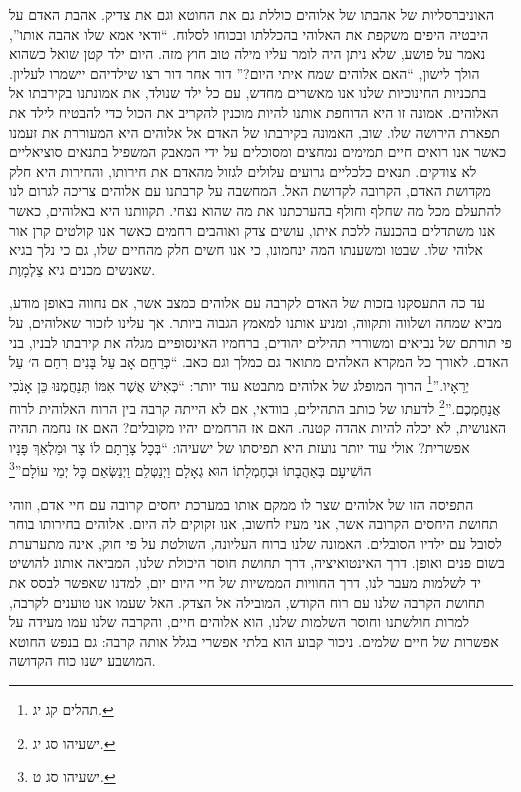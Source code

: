 \documentclass[12pt, extrafontsizes, twopage, a5paper]{memoir}
\begin{document}
האוניברסליות של אהבתו של אלוהים כוללת גם את החוטא וגם את צדיק. אהבת האדם על היבטיה היפים משקפת את האלוהי בהכללתו ובכוחו לסלוח. ``ודאי אמא שלו אהבה אותו'', נאמר על פושע, שלא ניתן היה לומר עליו מילה טוב חוץ מזה. היום ילד קטן שואל כשהוא הולך לישון, ``האם אלוהים שמח איתי היום?'' דור אחר דור רצו שילדיהם יישמרו לעליון. בתכניות החינוכיות שלנו אנו מאשרים מחדש, עם כל ילד שנולד, את אמונתנו בקירבתו אל האלוהים. אמונה זו היא הדוחפת אותנו להיות מוכנין להקריב את הכול כדי להבטיח לילד את תפארת הירושה שלו. שוב, האמונה בקירבתו של האדם אל אלוהים היא המעוררת את זעמנו כאשר אנו רואים חיים תמימים נמחצים ומסוכלים על ידי המאבק המשפיל בתנאים סוציאליים לא צודקים. תנאים כלכליים גרועים עלולים לגזול מהאדם את חירותו, והחירות היא חלק מקדושת האדם, הקרובה לקדושת האל. המחשבה על קרבתנו עם אלוהים צריכה לגרום לנו להתעלם מכל מה שחלף וחולף בהערכתנו את מה שהוא נצחי. תקוותנו היא באלוהים, כאשר אנו משתדלים בהכנעה ללכת איתו, עושים צדק ואוהבים רחמים כאשר אנו קולטים קרן אור אלוהי שלו. שבטו ומשענתו המה ינחמונו, כי אנו חשים חלק מהחיים שלו, גם כי נלך בגיא שאנשים מכנים גיא צַלְמָוֶת.

עד כה התעסקנו בזכות של האדם לקרבה עם אלוהים כמצב אשר, אם נחווה באופן מודע, מביא שמחה ושלווה ותקווה, ומניע אותנו למאמץ הגבוה ביותר. אך עלינו לזכור שאלוהים, על פי תורתם של נביאים ומשוררי תהילים יהודים, ברחמיו האינסופיים מגלה את קירבתו לבניו, בני האדם. לאורך כל המקרא האלהים מתואר גם כמלך וגם כאב. ``כְּרַחֵם אָב עַל בָּנִים רִחַם ה׳ עַל יְרֵאָיו.''\footnote{תהלים קג יג.} הרוך המופלג של אלוהים מתבטא עוד יותר: ``כְּאִישׁ אֲשֶׁר אִמּוֹ תְּנַחֲמֶנּוּ כֵּן אָנֹכִי אֲנַחֶמְכֶם.''\footnote{ישעיהו סג יג.} לדעתו של כותב התהילים, בוודאי, אם לא הייתה קרבה בין הרוח האלוהית לרוח האנושית, לא יכלה להיות אהדה קטנה. האם אז הרחמים יהיו מקובלים? האם אז נחמה תהיה אפשרית? אולי עוד יותר נועזת היא תפיסתו של ישעיהו: ``בְּכׇל צָרָתָם לוֹ צָר וּמַלְאַךְ פָּנָיו הוֹשִׁיעָם בְּאַהֲבָתוֹ וּבְחֶמְלָתוֹ הוּא גְאָלָם וַיְנַטְּלֵם וַיְנַשְּׂאֵם כׇּל יְמֵי עוֹלָם''\footnote{ישעיהו סג ט.}

התפיסה הזו של אלוהים שצר לו ממקם אותו במערכת יחסים קרובה עם חיי אדם, וזוהי תחושת היחסים הקרובה אשר, אני מעיז לחשוב, אנו זקוקים לה היום. אלוהים בחירותו בוחר לסובל עם ילדיו הסובלים. האמונה שלנו ברוח העליונה, השולטת על פי חוק, אינה מתערערת בשום פנים ואופן. דרך האינטואיציה, דרך תחושת חוסר היכולת שלנו, המביאה אותונ להושיט יד לשלמות מעבר לנו, דרך החוויות הממשיות של חיי היום יום, למדנו שאפשר לבסס את תחושת הקרבה שלנו עם רוח הקודש, המובילה אל הצדק. האל שעמו אנו טוענים לקרבה, למרות חולשתנו וחוסר השלמות שלנו, הוא אלוהים חיים, והקרבה שלנו עמו מעידה על אפשרות של חיים שלמים. ניכור קבוע הוא בלתי אפשרי בגלל אותה קרבה: גם בנפש החוטא המושבע ישנו כוח הקדושה.
\end{document}
